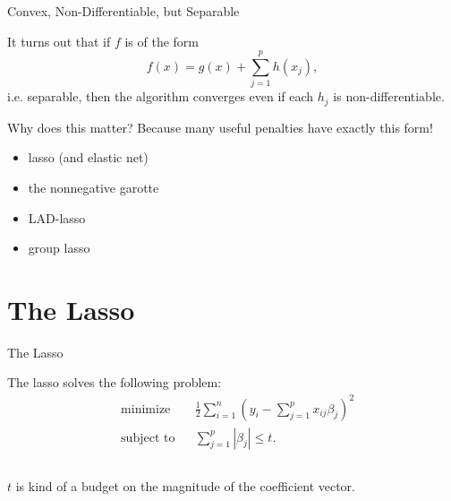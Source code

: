 \documentclass[10pt,ignorenonframetext]{beamer}
\begin{document}
\begin{frame}{Convex, Non-Differentiable, but Separable}

It turns out that if \(f\) is of the form \[f(x) = g(x) + \sum_{j=1}^p h(x_j),\] i.e. \alert{separable}, then the algorithm converges even if each \(h_j\) is non-differentiable.

\medskip

\pause

Why does this matter? Because many useful penalties have exactly this form!
\begin{itemize}
    \item lasso (and elastic net)
    \item the nonnegative garotte
    \item LAD-lasso
    \item group lasso
\end{itemize}
\end{frame}

\section{The Lasso}

\begin{frame}{The Lasso}

The lasso solves the following problem:
\[
\begin{aligned}
&\text{minimize} && \frac 12 \sum_{i=1}^n \left( y_i - \sum_{j=1}^p x_{ij}\beta_j \right)^2\\
& \text{subject to} && \sum_{j=1}^p |\beta_j| \leq t.
\end{aligned}
\]


\begin{columns}
\begin{column}{0.45\linewidth}
    \(t\) is kind of a \alert{budget} on the magnitude of the coefficient vector.
\end{column}
\begin{column}{0.45\linewidth}
    \begin{figure}
        \centering
        \pgfplotsset{width=6cm,height=6cm}
        
    \end{figure}
\end{column}
\end{columns}
\end{frame}
\end{document}
